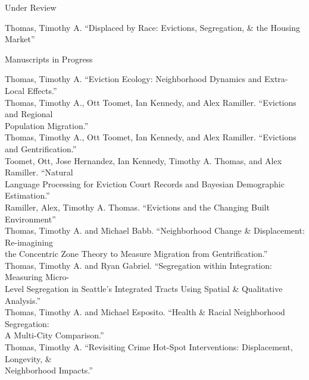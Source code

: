 \documentclass{resume} %
\begin{document}

%

\begin{rSection}{Under Review}
\vspace{5mm}

Thomas, Timothy A. ``Displaced by Race: Evictions, Segregation, \& the Housing Market''

\vspace{5mm}
\end{rSection}


%

\begin{rSection}{Manuscripts in Progress}
\vspace{5mm}

Thomas, Timothy A. ``Eviction Ecology: Neighborhood Dynamics and Extra-Local Effects.''\\

Thomas, Timothy A., Ott Toomet, Ian Kennedy, and Alex Ramiller. ``Evictions and Regional\\
	\hspace*{.25in}Population Migration.''\\

Thomas, Timothy A., Ott Toomet, Ian Kennedy, and Alex Ramiller. ``Evictions and Gentrification.''\\

Toomet, Ott, Jose Hernandez, Ian Kennedy, Timothy A. Thomas, and Alex Ramiller. ``Natural\\
	\hspace*{.25in}Language Processing for Eviction Court Records and Bayesian Demographic Estimation.''\\

Ramiller, Alex, Timothy A. Thomas. ``Evictions and the Changing Built Environment''\\

Thomas, Timothy A. and Michael Babb. ``Neighborhood Change \& Displacement: Re-imagining\\
\hspace*{.25in}the Concentric Zone Theory to Measure Migration from Gentrification.''\\

Thomas, Timothy A. and Ryan Gabriel. ``Segregation within Integration: Measuring Micro-\\
	\hspace*{.25in}Level Segregation in Seattle’s Integrated Tracts Using Spatial \& Qualitative Analysis.''\\

Thomas, Timothy A. and Michael Esposito. ``Health \& Racial Neighborhood Segregation: \\
\hspace*{.25in}A Multi-City Comparison.''\\

Thomas, Timothy A. ``Revisiting Crime Hot-Spot Interventions: Displacement, Longevity, \& \\
	\hspace*{.25in}Neighborhood Impacts.''
\vspace{5mm}
\end{rSection}
\end{document}
